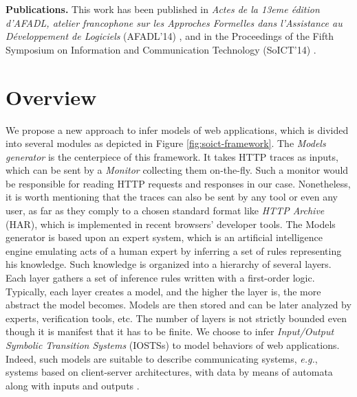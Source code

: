 \textbf{Publications.} This work has been published in
\emph{Actes de la 13eme {\'e}dition d'AFADL, atelier francophone
sur les Approches Formelles dans l'Assistance au
D{\'e}veloppement de Logiciels} (AFADL'14)
\cite{durand2014inference}, and in the Proceedings of the Fifth
Symposium on Information and Communication Technology (SoICT'14)
\cite{DBLP:conf/soict/DurandS14}.


\section{Overview}

We propose a new approach to infer models of web applications,
which is divided into several modules as depicted in Figure
\ref{fig:soict-framework}. The \textit{Models generator} is the
centerpiece of this framework. It takes HTTP traces as inputs,
which can be sent by a \textit{Monitor} collecting them on-the-fly.
Such a monitor would be responsible for reading HTTP requests and
responses in our case. Nonetheless, it is worth mentioning that the
traces can also be sent by any tool or even any user, as far as
they comply to a chosen standard format like \textit{HTTP
Archive} (HAR), which is implemented in recent browsers'
developer tools. The Models generator is based upon an expert
system, which is an artificial intelligence engine emulating acts
of a human expert by inferring a set of rules representing his
knowledge.  Such knowledge is organized into a hierarchy of
several layers.  Each layer gathers a set of inference rules
written with a first-order logic. Typically, each layer creates a
model, and the higher the layer is, the more abstract the model
becomes. Models are then stored and can be later analyzed by
experts, verification tools, etc. The number of layers is not
strictly bounded even though it is manifest that it has to be
finite. We choose to infer \emph{Input/Output Symbolic Transition
Systems} (IOSTSs) to model behaviors of web applications. Indeed,
such models are suitable to describe communicating systems,
\emph{e.g.}, systems based on client-server architectures, with
data by means of automata along with inputs and outputs
\cite{Rusu:2000:AST:647982.743536}.

